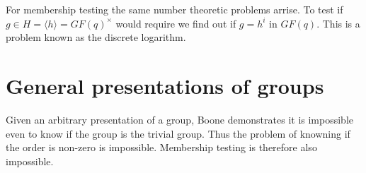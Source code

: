 \documentclass[12pt]{article}
\begin{document}
For membership testing the same number theoretic problems arrise.
To test if $g\in H=\langle h\rangle=GF(q)^\times$ would require we find out if
$g=h^i$ in $GF(q)$.  This is a problem known as the discrete logarithm.

\section{General presentations of groups}

Given an arbitrary presentation of a group, Boone demonstrates it is impossible even to know if the group is the trivial group.  Thus the problem of knowning  if the order is non-zero is impossible.  Membership testing is therefore also impossible.
\end{document}

